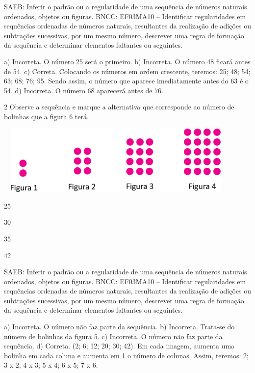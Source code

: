 \begin{escolha}
SAEB: Inferir o padrão ou a regularidade de uma sequência de números naturais ordenados, objetos ou figuras.
BNCC: EF03MA10 -- Identificar regularidades em sequências ordenadas de números naturais,
resultantes da realização de adições ou subtrações sucessivas, por um mesmo número,
descrever uma regra de formação da sequência e determinar elementos faltantes ou seguintes.


a) Incorreta. O número 25 será o primeiro.
b) Incorreta. O número 48 ficará antes de 54.
c) Correta. Colocando os números em ordem crescente, teremos: 25; 48; 54; 63; 68; 76; 95. Sendo assim, o número que aparece imediatamente antes do 63 é o 54.
d) Incorreta. O número 68 aparecerá antes de 76.

\num{2} Observe a sequência e marque a alternativa que corresponde ao número de bolinhas que a figura 6 terá.


\includegraphics[width=4.75875in,height=1.35012in]{media/image37.png}

\begin{escolha}

\item
  25
\item
  30
\item
  35
\item
  42
\end{escolha}

SAEB: Inferir o padrão ou a regularidade de uma sequência de números naturais ordenados, objetos ou figuras.
BNCC: EF03MA10 -- Identificar regularidades em sequências ordenadas de números naturais,
resultantes da realização de adições ou subtrações sucessivas, por um mesmo número,
descrever uma regra de formação da sequência e determinar elementos faltantes ou seguintes.

a) Incorreta. O número não faz parte da sequência.
b) Incorreta. Trata-se do número de bolinhas da figura 5.
c) Incorreta. O número não faz parte da sequência.
d) Correta. (2; 6; 12; 20; 30; 42). Em cada imagem, aumenta uma bolinha em cada coluna e aumenta em 1 o número de colunas. Assim, teremos: 2; 3 x 2; 4 x 3; 5 x 4; 6 x 5; 7 x 6.


\end{escolha}
